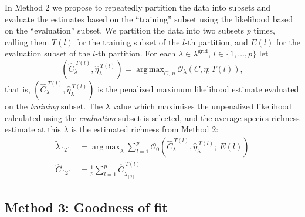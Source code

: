 \documentclass[12pt]{article}
\DeclareMathOperator*{\argmax}{arg\,max}
\newcommand{\lambdagrid}{\lambda^{\text{grid}}}
\theoremstyle{break}
\theoremstyle{break}
\begin{document}
In Method 2 we propose to repeatedly partition the data into subsets and evaluate the estimates based on the ``training'' subset using the likelihood based on the ``evaluation'' subset.
We partition the data into two subsets $p$ times, calling them $T(l)$ for the training subset of the $l$-th partition, and $E(l)$ for the evaluation subset of the $l$-th partition. For each $\lambda \in \lambdagrid$, $l \in \{1, \dots , p\}$ let
\begin{equation}
\left(\widehat{C}_{\lambda}^{ \ T(l)}, \widehat{\eta}_{\lambda}^{ \ T(l)} \right) = \argmax_{C, \, \eta} \mathcal{O}_\lambda \left(C, \eta; T(l) \right), \label{eq:part_c_hats_method_2}
\end{equation}
that is, $\left(\widehat{C}_{\lambda}^{ \ T(l)}, \widehat{\eta}_{\lambda}^{ \ T(l)} \right)$ is the penalized maximum likelihood estimate evaluated on the \textit{training} subset.  The $\lambda$ value which maximises the unpenalized likelihood calculated using the \textit{evaluation} subset is selected, and the average species richness estimate at this $\lambda$ is the estimated richness from Method 2:
\begin{align}
\widetilde{\lambda}_{[2]} &= \argmax_\lambda \sum_{l=1}^p \mathcal{O}_0\left( \widehat{C}_{\lambda}^{ \ T(l)}, \widehat{\eta}_{\lambda}^{ \ T(l)} ; \  E(l) \right) \label{eq:selected_lambda_2} \\
\widehat{C}_{[2]} &= \frac{1}{p} \sum_{l=1}^p \widehat{C}_{\widetilde{\lambda}_{[2]}}^{ \ T(l)}
\end{align}


%
%
%
\subsection{Method 3: Goodness of fit}
\end{document}
